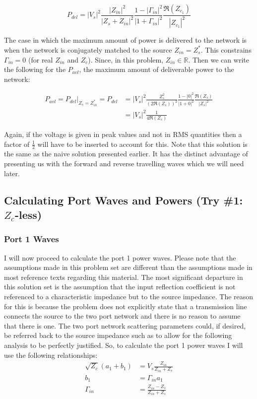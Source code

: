 \[ 
        P_{del} = \left| V_s \right|^2 
        \frac{\left| Z_{in}\right|^2}{\left| Z_s + Z_{in} \right|^2} 
        \frac{ 1 - \left| \Gamma_{in} \right|^2}{\left| 1+\Gamma_{in} \right|^2}
        \frac{\Re \left( Z_{c_1} \right)}{\left| Z_{c_1} \right|^2}
\]

The case in which the maximum amount of power is delivered to the network is
when the network is conjugately matched to the source $Z_{in} = Z_s^*$. This
constrains $\Gamma_{in} = 0$ (for real $Z_{in}$ and $Z_c$). Since, in this
problem, $Z_{in} \in \mathds{R}$. Then we can write the following for the
$P_{avl}$, the maximum amount of deliverable power to the network:

\begin{align*}
        P_{avl} = P_{del}|_{Z_s = Z_{in}^*} =  
        P_{del} &= \left| V_s \right|^2 
        \frac{Z_s^2}{\left( 2 \Re \left( Z_s \right) \right)^2} 
        \frac{ 1 - \left| 0 \right|^2}{\left| 1 + 0 \right|^2}
        \frac{\Re \left( Z_s \right)}{\left| Z_{s} \right|^2} \\
        &= \left| V_s \right|^2 \frac{1}{4 \Re \left( Z_s \right)}
\end{align*}

Again, if the voltage is given in peak values and not in RMS quantities then a
factor of $\frac{1}{2}$ will have to be inserted to account for this. Note that
this solution is the same as the naive solution presented earlier. It has the
distinct advantage of presenting us with the forward and reverse travelling
waves which we will need later.
\subsection{Calculating Port Waves and Powers (Try \#1: $Z_c$-less)}
\subsubsection{Port 1 Waves}
I will now proceed to calculate the port 1 power waves. Please note that the
assumptions made in this problem set are different than the assumptions made in
most reference texts regarding this material. The most significant departure in
this solution set is the assumption that the input reflection coefficient is not
referenced to a characteristic impedance but to the source impedance. The reason
for this is because the problem does not explicitly state that a transmission
line connects the source to the two port network and there is no reason to
assume that there is one. The two port network scattering parameters could, if
desired, be referred back to the source impedance such as to allow for the
following analysis to be perfectly justified. So, to calculate the port 1 power
waves I will use the following relationships:
\begin{align}
    \sqrt{Z_c}\left( a_1 + b_1 \right) &= V_s \frac{Z_{in}}{Z_{in}+Z_s}
    \label{eq1} \\
    b_1 &= \Gamma_{in}a_1 \label{eq2} \\
    \Gamma_{in} &=\frac{Z_{in}-Z_s}{Z_{in}+Z_s} \label{eq3}
\end{align}

